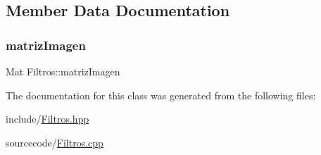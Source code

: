 \subsection{Member Data Documentation}
\mbox{\label{class_filtros_a7bb45c07cea0bed3d4a4b8a7cca38fe9}} 
\subsubsection{\texorpdfstring{matriz\+Imagen}{matrizImagen}}
{\footnotesize\ttfamily Mat Filtros\+::matriz\+Imagen}



The documentation for this class was generated from the following files\+:\begin{DoxyCompactItemize}
\item 
include/\hyperlink{_filtros_8hpp}{Filtros.\+hpp}\item 
sourcecode/\hyperlink{_filtros_8cpp}{Filtros.\+cpp}\end{DoxyCompactItemize}
